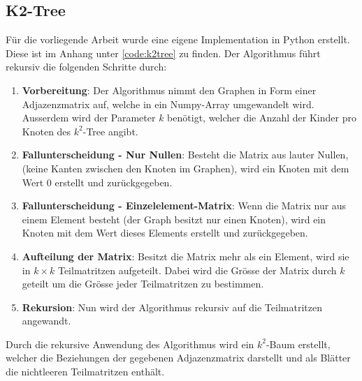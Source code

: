 \documentclass{ffhsthesis}
\begin{document}
\subsection{K2-Tree}
\label{ch:tree}
Für die vorliegende Arbeit wurde eine eigene Implementation in Python erstellt. Diese ist im Anhang unter \ref{code:k2tree} zu finden. Der Algorithmus führt rekursiv die folgenden Schritte durch:
\begin{enumerate}
    \item \textbf{Vorbereitung}: Der Algorithmus nimmt den Graphen in Form einer Adjazenzmatrix auf, welche in ein Numpy-Array umgewandelt wird. Ausserdem wird der Parameter $k$ benötigt, welcher die Anzahl der Kinder pro Knoten des $k^2$-Tree angibt.
    \item \textbf{Fallunterscheidung - Nur Nullen}: Besteht die Matrix aus lauter Nullen, (keine Kanten zwischen den Knoten im Graphen), wird ein Knoten mit dem Wert 0 erstellt und zurückgegeben.
    \item \textbf{Fallunterscheidung - Einzelelement-Matrix}: Wenn die Matrix nur aus einem Element besteht (der Graph besitzt nur einen Knoten), wird ein Knoten mit dem Wert dieses Elements erstellt und zurückgegeben.
    \item \textbf{Aufteilung der Matrix}: Besitzt die Matrix mehr als ein Element, wird sie in $k \times k$ Teilmatritzen aufgeteilt. Dabei wird die Grösse der Matrix durch $k$ geteilt um die Grösse jeder Teilmatritzen zu bestimmen. 
    \item \textbf{Rekursion}: Nun wird der Algorithmus rekursiv auf die Teilmatritzen angewandt.
\end{enumerate}
Durch die rekursive Anwendung des Algorithmus wird ein $k^2$-Baum erstellt, welcher die Beziehungen der gegebenen Adjazenzmatrix darstellt und als Blätter die nichtleeren Teilmatritzen enthält.
\end{document}
